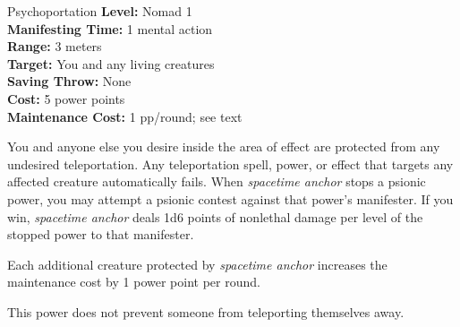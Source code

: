 {Psychoportation}
{
	\textbf{Level:}
	Nomad 1\\
	\textbf{Manifesting Time:}
	1 mental action\\
	\textbf{Range:}
	3 meters\\
	\textbf{Target:}
	You and any living creatures\\
	\textbf{Saving Throw:}
	None\\
	\textbf{Cost:}
	5 power points\\
	\textbf{Maintenance Cost:}
	1 pp/round; see text\\
}
{
	You and anyone else you desire inside the area of effect are protected from any undesired teleportation. Any teleportation spell, power, or effect that targets any affected creature automatically fails. When \emph{spacetime anchor} stops a psionic power, you may attempt a psionic contest against that power's manifester. If you win, \emph{spacetime anchor} deals 1d6 points of nonlethal damage per level of the stopped power to that manifester.

	Each additional creature protected by \emph{spacetime anchor} increases the maintenance cost by 1 power point per round.

	This power does not prevent someone from teleporting themselves away.
}
